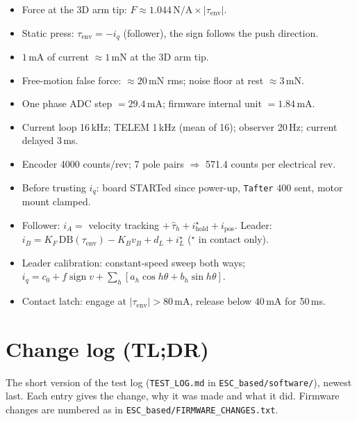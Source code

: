 \documentclass[11pt,a4paper]{article}
\newcommand{\iq}{i_q}
\newcommand{\mA}{\,\mathrm{mA}}
\newcommand{\mN}{\,\mathrm{mN}}
\newcommand{\NpA}{\,\mathrm{N/A}}
\newcommand{\file}[1]{\texttt{#1}}
\begin{document}
\begin{itemize}
  \item Force at the 3D arm tip: $F \approx 1.044\NpA \times |\tau_{\mathrm{env}}|$.
  \item Static press: $\tau_{\mathrm{env}} = -\iq$ (follower), the sign follows the push direction.
  \item $1\mA$ of current $\approx 1\mN$ at the 3D arm tip.
  \item Free-motion false force: $\approx 20\mN$ rms; noise floor at rest $\approx 3\mN$.
  \item One phase ADC step $= 29.4\mA$; firmware internal unit $= 1.84\mA$.
  \item Current loop 16\,kHz; TELEM 1\,kHz (mean of 16); observer 20\,Hz; current delayed 3\,ms.
  \item Encoder 4000 counts/rev; 7 pole pairs $\Rightarrow$ 571.4 counts per electrical rev.
  \item Before trusting $\iq$: board STARTed since power-up, \texttt{Tafter} 400 sent, motor mount clamped.
  \item Follower: $i_A = $ velocity tracking $+\,\hat\tau_h + i_{\mathrm{hold}}^\star + i_{\mathrm{pos}}$.
        Leader: $i_B = K_F\,\mathrm{DB}(\tau_{\mathrm{env}}) - K_B v_B + d_L + i_L^\star$ ($^\star$ in contact only).
  \item Leader calibration: constant-speed sweep both ways; $\iq = c_0 + f\operatorname{sign}v + \sum_h[a_h\cos h\theta + b_h\sin h\theta]$.
  \item Contact latch: engage at $|\tau_{\mathrm{env}}| > 80\mA$, release below $40\mA$ for 50\,ms.
\end{itemize}

\appendix
\section{Change log (TL;DR)}
\label{app:changelog}

The short version of the test log (\file{TEST\_LOG.md} in
\file{ESC\_based/software/}), newest last.
Each entry gives the change, why it was made and what it did. Firmware
changes are numbered as in \file{ESC\_based/FIRMWARE\_CHANGES.txt}.
\end{document}
